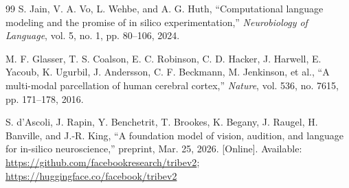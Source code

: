 \documentclass[conference]{IEEEtran}
\begin{document}
\begin{thebibliography}{99}
S. Jain, V. A. Vo, L. Wehbe, and A. G. Huth, ``Computational language modeling and the promise of in silico experimentation,'' \emph{Neurobiology of Language}, vol. 5, no. 1, pp. 80--106, 2024.

M. F. Glasser, T. S. Coalson, E. C. Robinson, C. D. Hacker, J. Harwell, E. Yacoub, K. Ugurbil, J. Andersson, C. F. Beckmann, M. Jenkinson, et al., ``A multi-modal parcellation of human cerebral cortex,'' \emph{Nature}, vol. 536, no. 7615, pp. 171--178, 2016.

S. d'Ascoli, J. Rapin, Y. Benchetrit, T. Brookes, K. Begany, J. Raugel, H. Banville, and J.-R. King, ``A foundation model of vision, audition, and language for in-silico neuroscience,'' preprint, Mar. 25, 2026. [Online]. Available: \url{https://github.com/facebookresearch/tribev2}; \url{https://huggingface.co/facebook/tribev2}

\end{thebibliography}
\end{document}
